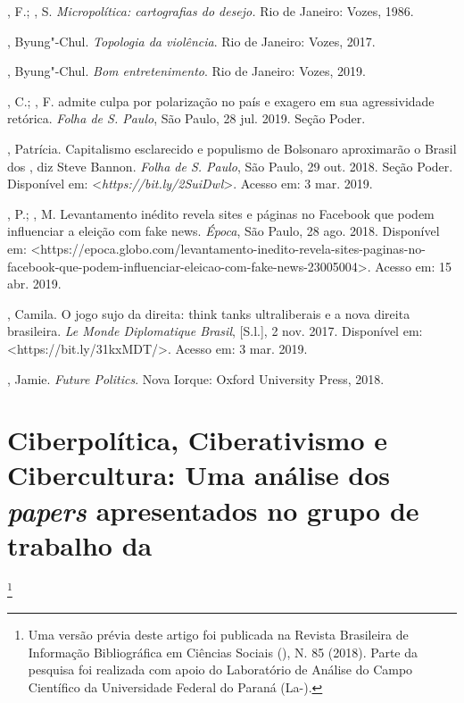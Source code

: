 \begin{Parskip}
, F.; , S. \emph{Micropolítica: cartografias do desejo.}
Rio de Janeiro: Vozes, 1986.

, Byung"-Chul. \emph{Topologia da violência}. Rio de Janeiro: Vozes,
2017.

, Byung"-Chul. \emph{Bom entretenimento}. Rio de Janeiro: Vozes, 2019.

, C.; , F.  admite culpa por polarização no país e
exagero em sua agressividade retórica. \emph{Folha de S. Paulo}, São
Paulo, 28 jul. 2019. Seção Poder.

, Patrícia. Capitalismo esclarecido e populismo de Bolsonaro
aproximarão o Brasil dos , diz Steve Bannon. \emph{Folha de S.
Paulo}, São Paulo, 29 out. 2018. Seção Poder. Disponível em:
\textless{}\emph{https://bit.ly/2SuiDwl}\textgreater{}.
Acesso em: 3 mar. 2019.

, P.; , M. Levantamento inédito revela sites e páginas
no Facebook que podem influenciar a eleição com fake news. \emph{Época},
São Paulo, 28 ago. 2018. Disponível em:
\textless{}https://epoca.globo.com/levantamento-inedito-revela-sites-paginas-no-facebook-que-podem-influenciar-eleicao-com-fake-news-23005004\textgreater{}.
Acesso em: 15 abr. 2019.

, Camila. O jogo sujo da direita: think tanks ultraliberais e a
nova direita brasileira. \emph{Le Monde Diplomatique Brasil},
{[}S.l.{]}, 2 nov. 2017. Disponível em:
\textless{}https://bit.ly/31kxMDT/\textgreater{}.
Acesso em: 3 mar. 2019.

, Jamie. \emph{Future Politics}. Nova Iorque: Oxford University
Press, 2018.
\end{Parskip}

\chapter*{Ciberpolítica, Ciberativismo e Cibercultura: Uma análise dos
\emph{papers} apresentados no grupo de trabalho da }\footnote{Uma
  versão prévia deste artigo foi publicada na Revista Brasileira de
  Informação Bibliográfica em Ciências Sociais (), N. 85 (2018).
  Parte da pesquisa foi realizada com apoio do Laboratório de Análise do
  Campo Científico da Universidade Federal do Paraná (La-).}

